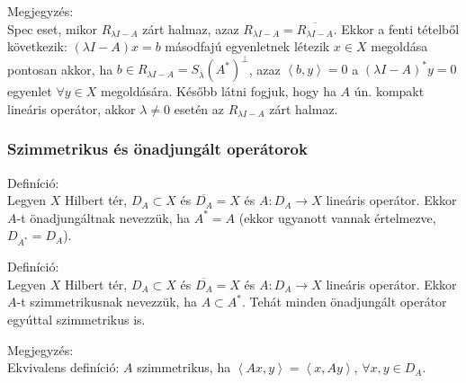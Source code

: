\documentclass[12pt,a4paper]{scrartcl}
\newenvironment{definicio}{}{}
\newenvironment{megjegyzes}{}{}
\begin{document}
\begin{megjegyzes}

Megjegyzés:\\
Spec eset, mikor \(R_{\lambda I - A}\) zárt halmaz, azaz
\(R_{\lambda I - A} = \overline{R_{\lambda I-A}}\). Ekkor a fenti
tételből következik: \(\left( {\lambda I - A} \right)x = b\) másodfajú
egyenletnek létezik \(x \in X\) megoldása pontosan akkor, ha
\(b \in R_{\lambda I - A} = S_{\overline{\lambda}}\left( A^{*} \right)^{\bot}\),
azaz \(\left\langle {b,y} \right\rangle = 0\) a
\(\left( {\lambda I - A} \right)^{*}y = 0\) egyenlet \(\forall y \in X\)
megoldására. Később látni fogjuk, hogy ha \(A\) ún. kompakt lineáris
operátor, akkor \(\lambda \neq 0\) esetén az \(R_{\lambda I - A}\) zárt
halmaz.

\end{megjegyzes}

\hypertarget{szimmetrikus-es-onadjungalt-operatorok}{%
\subsubsection{Szimmetrikus és önadjungált
operátorok}\label{szimmetrikus-es-onadjungalt-operatorok}}

\begin{definicio}

Definíció:\\
Legyen \(X\) Hilbert tér, \(D_{A} \subset X\) és
\(\overline{D_{A}} = X\) és \(\left. A:D_{A}\rightarrow X \right.\)
lineáris operátor. Ekkor \(A\)-t önadjungáltnak nevezzük, ha
\(A^{*} = A\) (ekkor ugyanott vannak értelmezve, \(D_{A^{*}} = D_{A}\)).

\end{definicio}

\begin{definicio}

Definíció:\\
Legyen \(X\) Hilbert tér, \(D_{A} \subset X\) és
\(\overline{D_{A}} = X\) és \(\left. A:D_{A}\rightarrow X \right.\)
lineáris operátor. Ekkor \(A\)-t szimmetrikusnak nevezzük, ha
\(A \subset A^{*}\). Tehát minden önadjungált operátor egyúttal
szimmetrikus is.

\end{definicio}

\begin{megjegyzes}

Megjegyzés:\\
Ekvivalens definíció: \(A\) szimmetrikus, ha
\(\left\langle {Ax,y} \right\rangle = \left\langle {x,Ay} \right\rangle\),
\(\forall x,y \in D_{A}\).

\end{megjegyzes}
\end{document}
